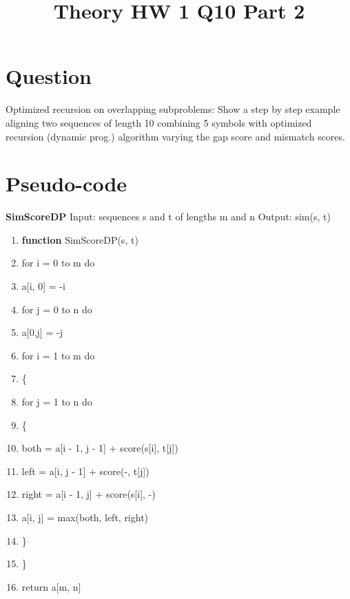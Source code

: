\documentclass[conference]{IEEEtran}
\begin{document}
\title{Theory HW 1 Q10 Part 2}

\author{
}

\maketitle

\section{Question}
%
Optimized recursion on overlapping subproblems:
Show a step by step example aligning two sequences of length 10 combining 5 symbols with
optimized recursion (dynamic prog.) algorithm varying the gap score and mismatch scores.




\section{Pseudo-code}

\textbf{SimScoreDP}
\newline
Input: sequences s and t of lengths m and n
\newline
Output: sim(s, t)

\begingroup
\renewcommand\labelenumi{\theenumi:}
\begin{enumerate}
\item \textbf{function} SimScoreDP(s, t)  \label{item:1}
\item for i = 0 to m do \label{item:2}
\item a[i, 0] = -i  \label{item:3}
\item for j = 0 to n do \label{item:4}
\item a[0,j] = -j \label{item:4}
\item for i = 1 to m do \label{item:4}
\item \{ \label{item:4}
\item for j = 1 to n do \label{item:4}
\item \{ \label{item:4}
\item both = a[i - 1, j - 1] + score(s[i], t[j]) \label{item:4}
\item left = a[i, j - 1] + score(-, t[j]) \label{item:4}
\item right = a[i - 1, j] + score(s[i], -) \label{item:4}
\item a[i, j] = max(both, left, right) \label{item:4}
\item \} \label{item:4}
\item \} \label{item:4}
\item return a[m, n] \label{item:4}
\end{enumerate}
\endgroup
\end{document}
